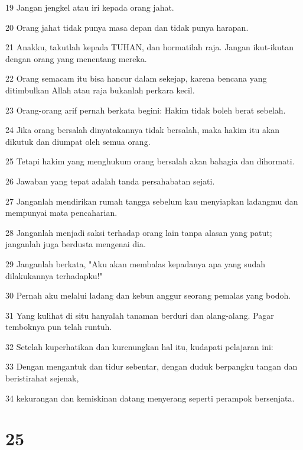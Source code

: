 \par 19 Jangan jengkel atau iri kepada orang jahat.
\par 20 Orang jahat tidak punya masa depan dan tidak punya harapan.
\par 21 Anakku, takutlah kepada TUHAN, dan hormatilah raja. Jangan ikut-ikutan dengan orang yang menentang mereka.
\par 22 Orang semacam itu bisa hancur dalam sekejap, karena bencana yang ditimbulkan Allah atau raja bukanlah perkara kecil.
\par 23 Orang-orang arif pernah berkata begini: Hakim tidak boleh berat sebelah.
\par 24 Jika orang bersalah dinyatakannya tidak bersalah, maka hakim itu akan dikutuk dan diumpat oleh semua orang.
\par 25 Tetapi hakim yang menghukum orang bersalah akan bahagia dan dihormati.
\par 26 Jawaban yang tepat adalah tanda persahabatan sejati.
\par 27 Janganlah mendirikan rumah tangga sebelum kau menyiapkan ladangmu dan mempunyai mata pencaharian.
\par 28 Janganlah menjadi saksi terhadap orang lain tanpa alasan yang patut; janganlah juga berdusta mengenai dia.
\par 29 Janganlah berkata, "Aku akan membalas kepadanya apa yang sudah dilakukannya terhadapku!"
\par 30 Pernah aku melalui ladang dan kebun anggur seorang pemalas yang bodoh.
\par 31 Yang kulihat di situ hanyalah tanaman berduri dan alang-alang. Pagar temboknya pun telah runtuh.
\par 32 Setelah kuperhatikan dan kurenungkan hal itu, kudapati pelajaran ini:
\par 33 Dengan mengantuk dan tidur sebentar, dengan duduk berpangku tangan dan beristirahat sejenak,
\par 34 kekurangan dan kemiskinan datang menyerang seperti perampok bersenjata.

\chapter{25}

